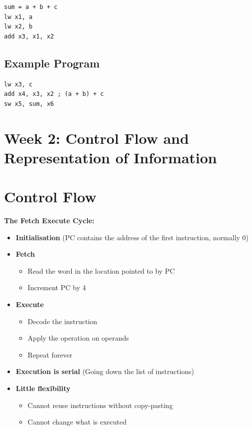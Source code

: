 \documentclass{article}
\begin{document}
\begin{lstlisting}
sum = a + b + c
lw x1, a
lw x2, b
add x3, x1, x2
\end{lstlisting}

\subsection*{Example Program}
\begin{lstlisting}
lw x3, c
add x4, x3, x2 ; (a + b) + c
sw x5, sum, x6
\end{lstlisting}




\newpage
\section*{Week 2: Control Flow and Representation of Information}


\section*{Control Flow}
\textbf{The Fetch Execute Cycle:}
\begin{itemize}
    \item \textbf{Initialisation} (PC contains the address of the first instruction, normally 0)
    \item \textbf{Fetch}
    \begin{itemize}
        \item Read the word in the location pointed to by PC
        \item Increment PC by 4
    \end{itemize}
    \item \textbf{Execute}
    \begin{itemize}
        \item Decode the instruction
        \item Apply the operation on operands
        \item Repeat forever
    \end{itemize}
    \item \textbf{Execution is serial} (Going down the list of instructions)
    \item \textbf{Little flexibility}
    \begin{itemize}
        \item Cannot reuse instructions without copy-pasting
        \item Cannot change what is executed
    \end{itemize}
\end{itemize}
\end{document}
